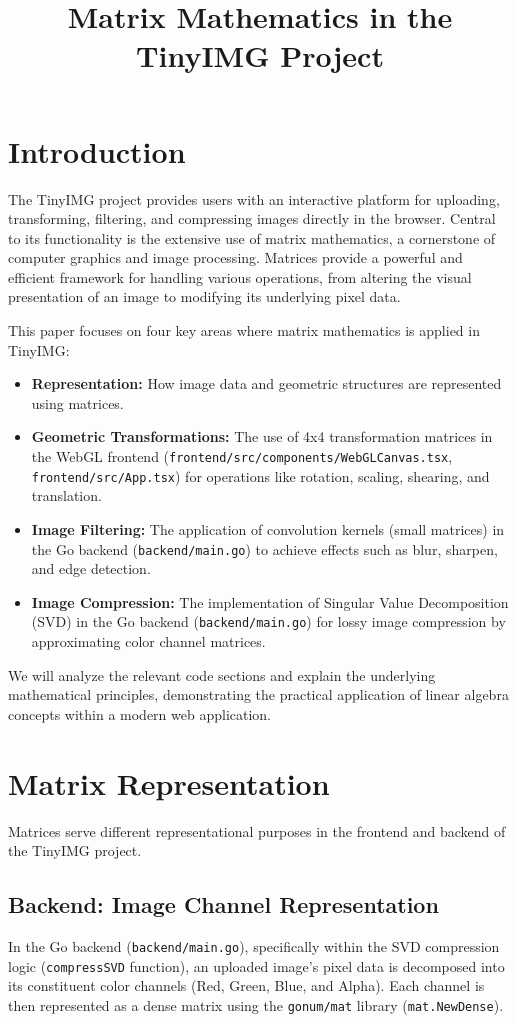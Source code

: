 \documentclass{article}
\title{Matrix Mathematics in the TinyIMG Project}
\begin{document}
\section{Introduction}

The TinyIMG project provides users with an interactive platform for uploading, transforming, filtering, and compressing images directly in the browser. Central to its functionality is the extensive use of matrix mathematics, a cornerstone of computer graphics and image processing. Matrices provide a powerful and efficient framework for handling various operations, from altering the visual presentation of an image to modifying its underlying pixel data.

This paper focuses on four key areas where matrix mathematics is applied in TinyIMG:
\begin{itemize}
    \item \textbf{Representation:} How image data and geometric structures are represented using matrices.
    \item \textbf{Geometric Transformations:} The use of 4x4 transformation matrices in the WebGL frontend (\texttt{frontend/src/components/WebGLCanvas.tsx}, \texttt{frontend/src/App.tsx}) for operations like rotation, scaling, shearing, and translation.
    \item \textbf{Image Filtering:} The application of convolution kernels (small matrices) in the Go backend (\texttt{backend/main.go}) to achieve effects such as blur, sharpen, and edge detection.
    \item \textbf{Image Compression:} The implementation of Singular Value Decomposition (SVD) in the Go backend (\texttt{backend/main.go}) for lossy image compression by approximating color channel matrices.
\end{itemize}
We will analyze the relevant code sections and explain the underlying mathematical principles, demonstrating the practical application of linear algebra concepts within a modern web application.

\section{Matrix Representation}

Matrices serve different representational purposes in the frontend and backend of the TinyIMG project.

\subsection{Backend: Image Channel Representation}
In the Go backend (\texttt{backend/main.go}), specifically within the SVD compression logic (\texttt{compressSVD} function), an uploaded image's pixel data is decomposed into its constituent color channels (Red, Green, Blue, and Alpha). Each channel is then represented as a dense matrix using the \texttt{gonum/mat} library (\texttt{mat.NewDense}).
\end{document}
